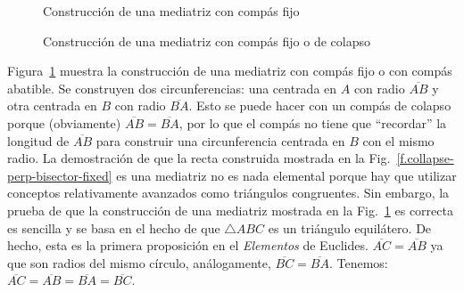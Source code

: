 \begin{figure}[t]
\begin{minipage}{.45\textwidth}
\begin{center}
\caption{Construcción de una mediatriz con compás fijo}\label{f.collapse-perp-bisector-fixed}
\end{center}
\end{minipage}
\hfill
\begin{minipage}{.45\textwidth}
\begin{center}
\caption{Construcción de una mediatriz con compás fijo o de colapso}\label{f.collapse-perp-bisector-collapse}
\end{center}
\end{minipage}
\end{figure}

Figura~\ref{f.collapse-perp-bisector-collapse} muestra la construcción de una mediatriz con compás fijo o con compás abatible. Se construyen dos circunferencias: una centrada en $A$ con radio $\overline{AB}$ y otra centrada en $B$ con radio $\overline{BA}$. Esto se puede hacer con un compás de colapso porque (obviamente) $\overline{AB}=\overline{BA}$, por lo que el compás no tiene que ``recordar'' la longitud de $\overline{AB}$ para construir una circunferencia centrada en $B$ con el mismo radio.
La demostración de que la recta construida mostrada en la Fig.~\ref{f.collapse-perp-bisector-fixed} es una mediatriz no es nada elemental porque hay que utilizar conceptos relativamente avanzados como triángulos congruentes. Sin embargo, la prueba de que la construcción de una mediatriz mostrada en la Fig.~\ref{f.collapse-perp-bisector-collapse} es correcta es sencilla y se basa en el hecho de que $\triangle ABC$ es un triángulo equilátero. De hecho, esta es la primera proposición en el \textit{Elementos} de Euclides.
$\overline{AC}=\overline{AB}$ ya que son radios del mismo círculo, análogamente, $\overline{BC}=\overline{BA}$. Tenemos: $\overline{AC}=\overline{AB}=\overline{BA}=\overline{BC}$.


